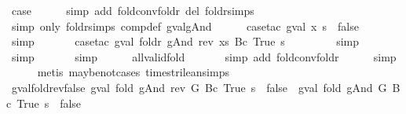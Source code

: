 \begin{isabellebody}
\ {\isacharquery}case\isanewline
\ \ \ \ \isamarkupfalse%
\ {\isacharparenleft}simp\ add{\isacharcolon}\ fold{\isacharunderscore}conv{\isacharunderscore}foldr\ del{\isacharcolon}\ foldr{\isachardot}simps{\isacharparenright}\isanewline
\ \ \ \ \isamarkupfalse%
\ {\isacharparenleft}simp\ only{\isacharcolon}\ foldr{\isachardot}simps\ comp{\isacharunderscore}def\ gval{\isacharunderscore}gAnd{\isacharparenright}\isanewline
\ \ \ \ \isamarkupfalse%
\ {\isacharparenleft}case{\isacharunderscore}tac\ {\isachardoublequoteopen}gval\ x\ s\ {\isacharequal}\ false{\isachardoublequoteclose}{\isacharparenright}\isanewline
\ \ \ \ \ \isamarkupfalse%
\ simp\isanewline
\ \ \ \ \ \isamarkupfalse%
\ {\isacharparenleft}case{\isacharunderscore}tac\ {\isachardoublequoteopen}gval\ {\isacharparenleft}foldr\ gAnd\ {\isacharparenleft}rev\ xs{\isacharparenright}\ {\isacharparenleft}Bc\ True{\isacharparenright}{\isacharparenright}\ s{\isachardoublequoteclose}{\isacharparenright}\isanewline
\ \ \ \ \ \ \ \isamarkupfalse%
\ simp\isanewline
\ \ \ \ \ \ \isamarkupfalse%
\ simp\isanewline
\ \ \ \ \ \isamarkupfalse%
\ simp\isanewline
\ \ \ \ \isamarkupfalse%
\ all{\isacharunderscore}valid{\isacharunderscore}fold\isanewline
\ \ \ \ \ \isamarkupfalse%
\ {\isacharparenleft}simp\ add{\isacharcolon}\ fold{\isacharunderscore}conv{\isacharunderscore}foldr{\isacharparenright}\isanewline
\ \ \ \ \isamarkupfalse%
\ simp\isanewline
\ \ \ \ \isamarkupfalse%
\ {\isacharparenleft}metis\ maybe{\isacharunderscore}not{\isachardot}cases\ times{\isacharunderscore}trilean{\isachardot}simps{\isacharparenleft}{}{\isacharparenright}{\isacharparenright}\isanewline
{}\isamarkupfalse%
%
\endisatagproof
{\isafoldproof}%
%
\isadelimproof
\isanewline
%
\endisadelimproof
\isanewline
{}\isamarkupfalse%
\ gval{\isacharunderscore}fold{\isacharunderscore}rev{\isacharunderscore}false{\isacharcolon}\ {\isachardoublequoteopen}gval\ {\isacharparenleft}fold\ gAnd\ {\isacharparenleft}rev\ G{\isacharparenright}\ {\isacharparenleft}Bc\ True{\isacharparenright}{\isacharparenright}\ s\ {\isacharequal}\ false\ {\isasymLongrightarrow}\ gval\ {\isacharparenleft}fold\ gAnd\ G\ {\isacharparenleft}Bc\ True{\isacharparenright}{\isacharparenright}\ s\ {\isacharequal}\ false{\isachardoublequoteclose}\isanewline
%
\isadelimproof
\ \ %
\endisadelimproof
%
\isatagproof
{}\isamarkupfalse%

\end{isabellebody}
